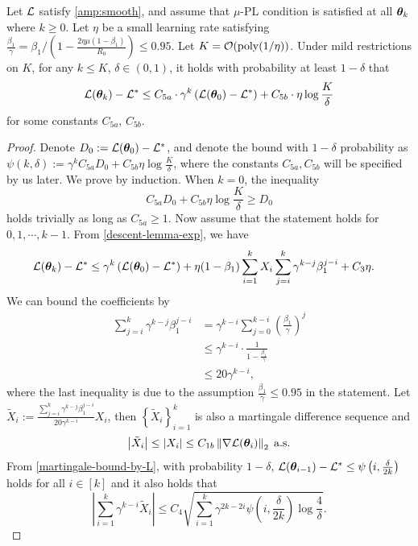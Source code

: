 \begin{lemma}\label{convergence}
Let $\mathcal{L}$ satisfy \cref{amp:smooth}, and assume that $\mu$-PL condition is satisfied at all ${\bm{\theta}}_k$ where $k \geq 0$. Let $\eta$ be a small learning rate satisfying $\frac{\beta_1}{\gamma} = \beta_1 / (1-\frac{2\eta\mu(1-\beta_1)}{R_0})\leq 0.95$. Let $K = \mathcal{O}(\mathrm{poly}(1/\eta))$. Under mild restrictions on $K$, for any $k \leq K$, $\delta \in (0,1)$, it holds with probability at least $1-\delta$ that $$\mathcal{L}({\bm{\theta}}_{k})-\mathcal{L}^* \leq C_{5a} \cdot \gamma^k \left(\mathcal{L}({\bm{\theta}}_0) - \mathcal{L}^*\right) + C_{5b} \cdot \eta \log \frac{K}{\delta}$$
    for some constants $C_{5a}$, $C_{5b}$.
\end{lemma}
\begin{proof}
    Denote $D_0 := \mathcal{L}({\bm{\theta}}_0) - \mathcal{L}^*$, and denote the bound with $1-\delta$ probability as $\psi(k, \delta) := \gamma
    ^k C_{5a}D_0 + C_{5b} \eta \log \frac{K}{\delta}$, where the constants $C_{5a}, C_{5b}$ will be specified by us later.
    We prove by induction. When $k=0$, the inequality  
$$C_{5a}D_0 + C_{5b} \eta \log \frac{K}{\delta} \geq D_0$$
holds trivially as long as $C_{5a} \geq 1$. Now assume that the statement holds for $0, 1, \cdots, k - 1$. From \cref{descent-lemma-exp}, we have
\begin{align*}
        \mathcal{L}({\bm{\theta}}_{k})-\mathcal{L}^* & \leq \gamma^k \left(\mathcal{L}({\bm{\theta}}_0) - \mathcal{L}^*\right) + \eta (1-\beta_1)\sum_{i=1}^{k}X_i  \sum_{j=i}^{k}\gamma^{k-j}\beta_1^{j-i} + C_{3} \eta.
\end{align*}
We can bound the coefficients by \begin{align*}
    \sum_{j=i}^{k}\gamma^{k-j}\beta_1^{j-i} &= \gamma^{k-i}\sum_{j=0}^{k-i}\left(\frac{\beta_1}{\gamma}\right)^j \\
    &\leq \gamma^{k-i} \cdot \frac{1}{1 - \frac{\beta_1}{\gamma}} \\
    &\leq 20 \gamma^{k-i},
\end{align*}
where the last inequality is due to the assumption $\frac{\beta_1}{\gamma} \leq 0.95$ in the statement.
Let $\tilde{X}_i := \frac{\sum_{j=i}^{k}\gamma^{k-j}\beta_1^{j-i}}{20\gamma^{k-i}}X_i$, then $\left\{\tilde{X}_i\right\}_{i=1}^{k}$ is also a martingale difference sequence and $$\left|\tilde{X}_i\right| \leq \left|X_i\right| \leq C_{1b}\left\|\nabla\mathcal{L}({\bm{\theta}}_i)\right\|_2\;\text{a.s.}$$
From \cref{martingale-bound-by-L}, with probability $1-\delta$, $\mathcal{L}({\bm{\theta}}_{i-1})-\mathcal{L}^* \leq \psi\left(i, \frac{\delta}{2k}\right)$ holds for all $i \in [k]$ and it also holds that
$$ \left|\sum_{i=1}^{k}\gamma^{k-i}\tilde{X}_i\right| \leq C_4\sqrt{\sum_{i=1}^{k}\gamma^{2k-2i} \psi\left(i,\frac{\delta}{2k}\right)\log\frac{4}{\delta}}.$$ 

\end{proof}
